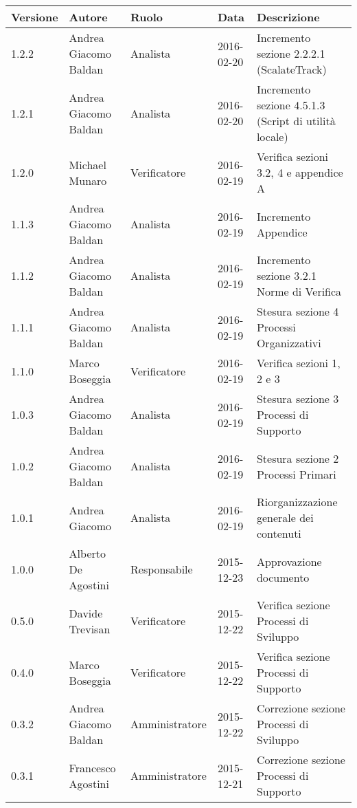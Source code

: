 \documentclass{scalatekids-article}
\begin{document}
\begin{center}
    \begin{tabular}{| l | l | l | l | l |}
        \hline
        Versione & Autore & Ruolo & Data & Descrizione \\
        \hline
        1.2.2 & Andrea Giacomo Baldan & Analista & 2016-02-20 & Incremento sezione 2.2.2.1 (ScalateTrack)\\
        \hline
        1.2.1 & Andrea Giacomo Baldan & Analista & 2016-02-20 & Incremento sezione 4.5.1.3 (Script di utilità locale)\\
        \hline
        1.2.0 & Michael Munaro & Verificatore & 2016-02-19 & Verifica sezioni 3.2, 4 e appendice A \\
        \hline
        1.1.3 & Andrea Giacomo Baldan & Analista & 2016-02-19 & Incremento Appendice\\
        \hline
        1.1.2 & Andrea Giacomo Baldan & Analista & 2016-02-19 & Incremento sezione 3.2.1 Norme di Verifica\\
        \hline
        1.1.1 & Andrea Giacomo Baldan & Analista & 2016-02-19 & Stesura sezione 4 Processi Organizzativi\\
        \hline
        1.1.0 & Marco Boseggia & Verificatore & 2016-02-19 & Verifica sezioni 1, 2 e 3\\
        \hline
        1.0.3 & Andrea Giacomo Baldan & Analista & 2016-02-19 & Stesura sezione 3 Processi di Supporto\\
        \hline
        1.0.2 & Andrea Giacomo Baldan & Analista & 2016-02-19 & Stesura sezione 2 Processi Primari\\
        \hline
        1.0.1 & Andrea Giacomo & Analista & 2016-02-19 & Riorganizzazione generale dei contenuti\\
        \hline
        1.0.0 & Alberto De Agostini & Responsabile & 2015-12-23 & Approvazione documento\\
        \hline
        0.5.0 & Davide Trevisan & Verificatore & 2015-12-22 & Verifica sezione Processi di Sviluppo\\
        \hline
        0.4.0 & Marco Boseggia & Verificatore & 2015-12-22 & Verifica sezione Processi di Supporto\\
        \hline
        0.3.2 & Andrea Giacomo Baldan & Amministratore & 2015-12-22 & Correzione sezione Processi di Sviluppo\\
        \hline
        0.3.1 & Francesco Agostini & Amministratore & 2015-12-21 & Correzione sezione Processi di Supporto\\

\end{tabular}
\end{center}
\end{document}
